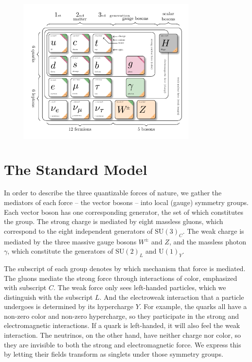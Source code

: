 % 
\begin{figure}[!h]
    \centering
    \includegraphics[width=0.8\textwidth]{figures/SM_figure.pdf}
\end{figure}
\section{The Standard Model}\label{ch:SM}
In order to describe the three quantizable forces of nature, we gather the mediators of each force -- the vector bosons -- into local (gauge) symmetry groups. 
Each vector boson has one corresponding generator, the set of which constitutes the group.
The strong charge is mediated by eight massless gluons, which correspond to the eight independent generators of $\text{SU}(3)_C$. 
The weak charge is mediated by the three massive gauge bosons $W^\pm$ and $Z$, and the massless photon $\gamma$, 
which constitute the generators of $\text{SU}(2)_L$ and $\text{U}(1)_Y$. 

The subscript of each group denotes by which mechanism that force is mediated. The gluons mediate the strong force through interactions of color,
emphasized with subscript $C$. The weak force only sees left-handed particles, 
which we distinguish with the subscript $L$. And the electroweak interaction that a particle undergoes is determined by its hypercharge $Y$. 
For example, the quarks all have a non-zero color and non-zero hypercharge, 
so they participate in the strong and electromagnetic interactions. If a quark is left-handed, it will also feel the weak interaction. 
The neutrinos, on the other hand, have neither charge nor color, 
so they are invisible to both the strong and electromagnetic force. We express this by letting their fields transform as singlets under those symmetry groups.

